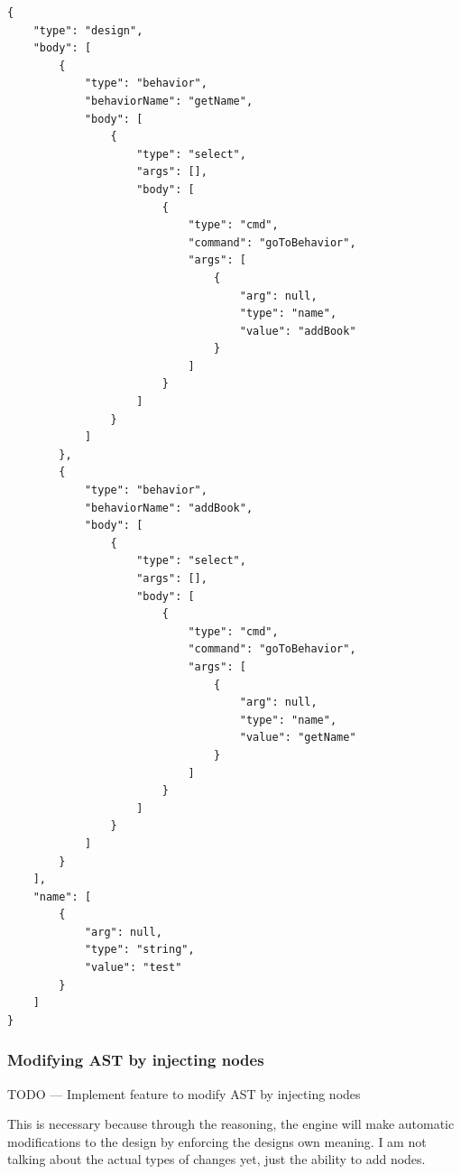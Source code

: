 \begin{verbatim}
{
    "type": "design",
    "body": [
        {
            "type": "behavior",
            "behaviorName": "getName",
            "body": [
                {
                    "type": "select",
                    "args": [],
                    "body": [
                        {
                            "type": "cmd",
                            "command": "goToBehavior",
                            "args": [
                                {
                                    "arg": null,
                                    "type": "name",
                                    "value": "addBook"
                                }
                            ]
                        }
                    ]
                }
            ]
        },
        {
            "type": "behavior",
            "behaviorName": "addBook",
            "body": [
                {
                    "type": "select",
                    "args": [],
                    "body": [
                        {
                            "type": "cmd",
                            "command": "goToBehavior",
                            "args": [
                                {
                                    "arg": null,
                                    "type": "name",
                                    "value": "getName"
                                }
                            ]
                        }
                    ]
                }
            ]
        }
    ],
    "name": [
        {
            "arg": null,
            "type": "string",
            "value": "test"
        }
    ]
}
\end{verbatim}

\subsubsection{Modifying AST by injecting nodes}

TODO
---
Implement feature to modify AST by injecting nodes

This is necessary because through the reasoning, the engine will make automatic modifications to the design by enforcing the designs own meaning. I am not talking about the actual types of changes yet, just the ability to add nodes.

